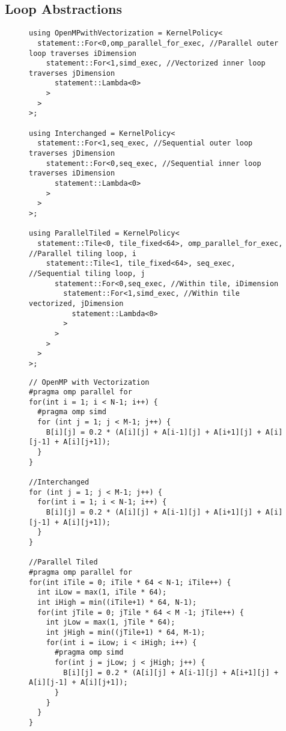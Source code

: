 \subsection{Loop Abstractions}

\begin{figure}
\begin{lstlisting}[caption={Kernel policies for different loop schedules.}, label={stencilSchedule}]
using OpenMPwithVectorization = KernelPolicy<
  statement::For<0,omp_parallel_for_exec, //Parallel outer loop traverses iDimension
    statement::For<1,simd_exec, //Vectorized inner loop traverses jDimension
      statement::Lambda<0>
    >
  >
>;

using Interchanged = KernelPolicy<
  statement::For<1,seq_exec, //Sequential outer loop traverses jDimension
    statement::For<0,seq_exec, //Sequential inner loop traverses iDimension
      statement::Lambda<0>
    >
  >
>;

using ParallelTiled = KernelPolicy<
  statement::Tile<0, tile_fixed<64>, omp_parallel_for_exec, //Parallel tiling loop, i
    statement::Tile<1, tile_fixed<64>, seq_exec, //Sequential tiling loop, j
      statement::For<0,seq_exec, //Within tile, iDimension
        statement::For<1,simd_exec, //Within tile vectorized, jDimension
          statement::Lambda<0>
        >
      >
    >
  >
>;
\end{lstlisting}
\end{figure}

\begin{figure}
\begin{lstlisting}[caption={Hand-changed loop schedules for C++ 5-point stencil computation. They are all shown in one figure, but in practice only one would appear within a code at a time.}, label={stencilScheduleCpp}]
// OpenMP with Vectorization
#pragma omp parallel for
for(int i = 1; i < N-1; i++) {
  #pragma omp simd
  for (int j = 1; j < M-1; j++) {
    B[i][j] = 0.2 * (A[i][j] + A[i-1][j] + A[i+1][j] + A[i][j-1] + A[i][j+1]);
  }
}

//Interchanged
for (int j = 1; j < M-1; j++) {
  for(int i = 1; i < N-1; i++) {
    B[i][j] = 0.2 * (A[i][j] + A[i-1][j] + A[i+1][j] + A[i][j-1] + A[i][j+1]);
  }
}

//Parallel Tiled
#pragma omp parallel for
for(int iTile = 0; iTile * 64 < N-1; iTile++) {
  int iLow = max(1, iTile * 64);
  int iHigh = min((iTile+1) * 64, N-1);
  for(int jTile = 0; jTile * 64 < M -1; jTile++) {
    int jLow = max(1, jTile * 64);
    int jHigh = min((jTile+1) * 64, M-1);
    for(int i = iLow; i < iHigh; i++) {
      #pragma omp simd
      for(int j = jLow; j < jHigh; j++) {
        B[i][j] = 0.2 * (A[i][j] + A[i-1][j] + A[i+1][j] + A[i][j-1] + A[i][j+1]);
      }
    }
  }
}
\end{lstlisting}
\end{figure}

